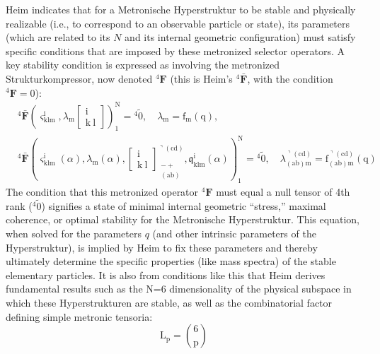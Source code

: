 \documentclass[12pt]{article}
\newcommand{\q}[1]{\enquote{#1}}
\newcommand{\metronisiertekondensor}[1]{{}^{#1}\mathbf{F}}
\begin{document}
\begin{itemize}
    Heim indicates that for a Metronische Hyperstruktur to be stable and physically realizable (i.e., to correspond to an observable particle or state), its parameters (which are related to its  \(N\) and its internal geometric configuration) must satisfy specific conditions that are imposed by these metronized selector operators. A key stability condition is expressed as involving the metronized Strukturkompressor, now denoted \( \metronisiertekondensor{4} \) (this is Heim's \( {}^4\bar{\mathbf{F}} \), with the condition \( \metronisiertekondensor{4}=0 \)):
    \begin{equation}
\begin{aligned}
& {}^4\bar{\mathbf{F}} \left( \varsigma^{\mathrm{i}}_{\mathrm{klm}}, \lambda_{\mathrm{m}} \left[ \begin{matrix} \mathrm{i} \\ \mathrm{k\ l} \end{matrix} \right] \right)_1^\mathrm{N} = {}^4\tilde{0}, \quad \lambda_{\mathrm{m}} = \mathrm{f}_{\mathrm{m}}(\mathrm{q}), \\
& {}^4\bar{\mathbf{F}} \left( \varsigma^{\mathrm{i}}_{\mathrm{klm}}(\alpha), \lambda_{\mathrm{m}}(\alpha), \left[ \begin{matrix} \mathrm{i} \\ \mathrm{k\ l} \end{matrix} \right]^{\urcorner(\mathrm{cd})}_{\substack{- + \\ (\mathrm{ab})}}, \mathfrak{q}^{\mathrm{i}}_{\mathrm{klm}}(\alpha) \right)_1^\mathrm{N} = {}^4\tilde{0}, \quad \lambda^{\urcorner(\mathrm{cd})}_{(\mathrm{ab})\mathrm{m}} = \mathrm{f}^{\urcorner(\mathrm{cd})}_{(\mathrm{ab})\mathrm{m}}(\mathrm{q})
\end{aligned} \tag{100}
\label{eq:original_final_stability_condition}
\end{equation}
    The condition that this metronized operator \( \metronisiertekondensor{4} \) must equal a null tensor of 4th rank (\( {}^{4}\tilde{0} \)) signifies a state of minimal internal geometric \q{stress,} maximal coherence, or optimal stability for the Metronische Hyperstruktur. This equation, when solved for the parameters \(q\) (and other intrinsic parameters of the Hyperstruktur), is implied by Heim to fix these parameters and thereby ultimately determine the specific properties (like mass spectra) of the stable elementary particles. It is also from conditions like this that Heim derives fundamental results such as the N=6 dimensionality of the physical subspace in which these Hyperstrukturen are stable, as well as the combinatorial factor defining simple metronic tensoria:
    \begin{equation}
    \mathrm{L_p} = \binom{6}{\mathrm{p}} \tag{100a}
    \end{equation}


\end{itemize}
\end{document}

